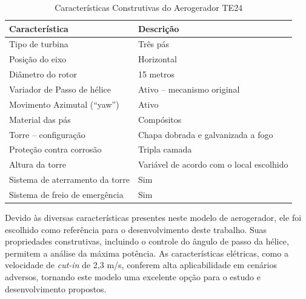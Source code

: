      \begin{table}[h]
        \centering
        \caption{Características Construtivas do Aerogerador TE24}
        \begin{tabular}{|l|l|}
        \toprule
        \textbf{Característica}                  & \textbf{Descrição}                                  \\ \midrule
        Tipo de turbina                          & Três pás                                            \\
        Posição do eixo                          & Horizontal                                          \\
        Diâmetro do rotor                        & 15 metros                                           \\
        Variador de Passo de hélice              & Ativo – mecanismo original                           \\
        Movimento Azimutal (“yaw”)               & Ativo                                               \\
        Material das pás                         & Compósitos                                          \\
        Torre – configuração                     & Chapa dobrada e galvanizada a fogo                  \\
        Proteção contra corrosão                 & Tripla camada                                       \\
        Altura da torre                          & Variável de acordo com o local escolhido            \\
        Sistema de aterramento da torre          & Sim                                                 \\
        Sistema de freio de emergência           & Sim                                                 \\ \bottomrule
        \end{tabular}
        \label{tab:TE24_DadosTecnicos_Construtivos}
    \end{table}
\par Devido às diversas características presentes neste modelo de aerogerador, ele foi escolhido como referência para o desenvolvimento deste trabalho. Suas propriedades construtivas, incluindo o controle do ângulo de passo da hélice, permitem a análise da máxima potência. As características elétricas, como a velocidade de \textit{cut-in} de 2,3 m/s, conferem alta aplicabilidade em cenários adversos, tornando este modelo uma excelente opção para o estudo e desenvolvimento propostos.


